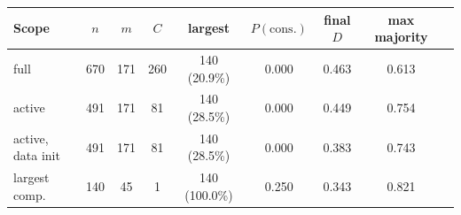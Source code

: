 \begin{tabular}{@{}lcccccccc@{}}
\toprule
Scope & $n$ & $m$ & $C$ & largest & $P(\mathrm{cons.})$ & final $D$ & max majority \\
\midrule
full & 670 & 171 & 260 & 140 (20.9\%) & 0.000 & 0.463 & 0.613 \\
active & 491 & 171 & 81 & 140 (28.5\%) & 0.000 & 0.449 & 0.754 \\
active, data init & 491 & 171 & 81 & 140 (28.5\%) & 0.000 & 0.383 & 0.743 \\
largest comp. & 140 & 45 & 1 & 140 (100.0\%) & 0.250 & 0.343 & 0.821 \\
\bottomrule
\end{tabular}
